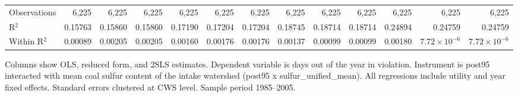 \begin{table}[htbp]
\begin{adjustbox}{width = \textwidth, center}
\begin{tabular}{lrrrrrrrrrrrr}
          \\
         
         Observations                                                        & 6,225    & 6,225          & 6,225          & 6,225    & 6,225         & 6,225         & 6,225    & 6,225    & 6,225     & 6,225        & 6,225                 & 6,225\\  
         R$^2$                                                               & 0.15763  & 0.15860        & 0.15860        & 0.17190  & 0.17204       & 0.17204       & 0.18745  & 0.18714  & 0.18714   & 0.24894      & 0.24759               & 0.24759\\  
         Within R$^2$                                                        & 0.00089  & 0.00205        & 0.00205        & 0.00160  & 0.00176       & 0.00176       & 0.00137  & 0.00099  & 0.00099   & 0.00180      & $7.72\times 10^{-6}$  & $7.72\times 10^{-6}$\\   
         
         \bottomrule
         
      \end{tabular}
      
      
      
   \end{adjustbox}
      {\tiny\linespread{1}\selectfont \par \raggedright 
   Columns show OLS, reduced form, and 2SLS estimates. Dependent variable is days out of the year in violation. Instrument is post95 interacted with mean coal sulfur content of the intake watershed (post95 x sulfur\_unified\_mean). All regressions include utility and year fixed effects. Standard errors clustered at CWS level. Sample period 1985--2005.}
   
\end{table}


